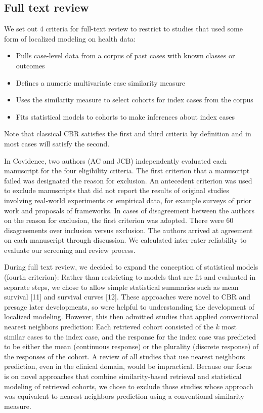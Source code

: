 \documentclass[preprint, 3p,
authoryear]{elsarticle} %
\providecommand{\tightlist}{%
  \setlength{\itemsep}{0pt}\setlength{\parskip}{0pt}}
\begin{document}
\hypertarget{full-text-review}{%
\subsection{Full text review}\label{full-text-review}}

We set out 4 criteria for full-text review to restrict to studies that
used some form of localized modeling on health data:

\begin{itemize}
\tightlist
\item
  Pulls case-level data from a corpus of past cases with known classes
  or outcomes
\item
  Defines a numeric multivariate case similarity measure
\item
  Uses the similarity measure to select cohorts for index cases from the
  corpus
\item
  Fits statistical models to cohorts to make inferences about index
  cases
\end{itemize}

Note that classical CBR satisfies the first and third criteria by
definition and in most cases will satisfy the second.

In Covidence, two authors (AC and JCB) independently evaluated each
manuscript for the four eligibility criteria. The first criterion that a
manuscript failed was designated the reason for exclusion. An antecedent
criterion was used to exclude manuscripts that did not report the
results of original studies involving real-world experiments or
empirical data, for example surveys of prior work and proposals of
frameworks. In cases of disagreement between the authors on the reason
for exclusion, the first criterion was adopted. There were 60
disagreements over inclusion versus exclusion. The authors arrived at
agreement on each manuscript through discussion. We calculated
inter-rater reliability to evaluate our screening and review process.

During full text review, we decided to expand the conception of
statistical models (fourth criterion): Rather than restricting to models
that are fit and evaluated in separate steps, we chose to allow simple
statistical summaries such as mean survival {[}11{]} and survival curves
{[}12{]}. These approaches were novel to CBR and presage later
developments, so were helpful to understanding the development of
localized modeling. However, this then admitted studies that applied
conventional nearest neighbors prediction: Each retrieved cohort
consisted of the \(k\) most similar cases to the index case, and the
response for the index case was predicted to be either the mean
(continuous response) or the plurality (discrete response) of the
responses of the cohort. A review of all studies that use nearest
neighbors prediction, even in the clinical domain, would be impractical.
Because our focus is on novel approaches that combine similarity-based
retrieval and statistical modeling of retrieved cohorts, we chose to
exclude those studies whose approach was equivalent to nearest neighbors
prediction using a conventional similarity measure.
\end{document}
